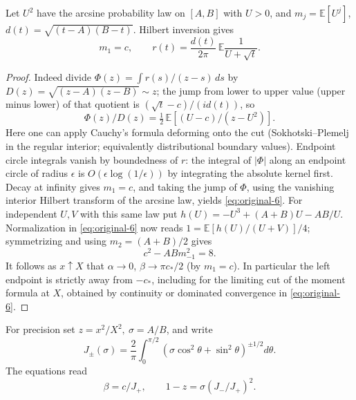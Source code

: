 \begin{lemma}\label{disk:hilbert}

Let \(U^2\) have the arcsine probability law on \([A,B]\) with \(U>0\), and \(m_j=\mathbb E[U^j]\), \(d(t)=\sqrt{(t-A)(B-t)}\).
Hilbert inversion gives
\begin{equation}
m_1=c,\qquad r(t)=\frac{d(t)}{2\pi}\,\mathbb E\frac1{U+\sqrt t}.
 \label{eq:original-6}
\end{equation}

\end{lemma}\begin{proof}

Indeed divide \(\Phi(z)=\int r(s)/(z-s)\,ds\) by \(D(z)=\sqrt{(z-A)(z-B)}\sim z\); the jump from lower to upper value (upper minus lower) of that quotient is \((\sqrt t-c)/(i d(t))\), so
\[
 \Phi(z)/D(z)=\tfrac12\,\mathbb E[(U-c)/(z-U^2)].
\]
Here one can apply Cauchy's formula deforming onto the cut (Sokhotski--Plemelj in the regular interior; equivalently distributional boundary values).
Endpoint circle integrals vanish by boundedness of \(r\): the integral of \(|\Phi|\) along an endpoint circle of radius \(\epsilon\) is \(O(\epsilon\log(1/\epsilon))\) by integrating the absolute kernel first.
Decay at infinity gives \(m_1=c\), and taking the jump of \(\Phi\), using the vanishing interior Hilbert transform of the arcsine law, yields \eqref{eq:original-6}.
For independent \(U,V\) with this same law put \(h(U)=-U^3+(A+B)U-AB/U\).
Normalization in \eqref{eq:original-6} now reads \(1=\mathbb E[h(U)/(U+V)]/4\); symmetrizing and using \(m_2=(A+B)/2\) gives
\[
 c^2-AB m_{-1}^2=8.
\]
It follows as \(x\uparrow X\) that \(\alpha\to0\), \(\beta\to\pi c_*/2\) (by \(m_1=c\)).
In particular the left endpoint is strictly away from \(-c_*\), including for the limiting cut of the moment formula at \(X\), obtained by continuity or dominated convergence in \eqref{eq:original-6}.

\end{proof}

For precision set \(z=x^2/X^2,\ \sigma=A/B\), and write
\[
 J_\pm(\sigma)=\frac2\pi\int_0^{\pi/2}(\sigma\cos^2\theta+\sin^2\theta)^{\pm1/2}d\theta.
\]
The equations read
\begin{equation}
\beta=c/J_+,\qquad 1-z=\sigma(J_-/J_+)^2.
 \label{eq:original-7}
\end{equation}


